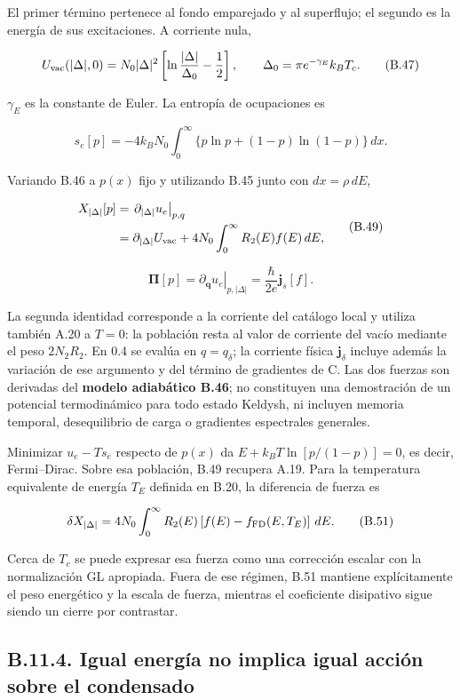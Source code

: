 \documentclass[
  spanish,
  10pt,
  a4paper,
]{article}
\begin{document}
El primer término pertenece al fondo emparejado y al superflujo; el
segundo es la energía de sus excitaciones. A corriente nula,

\[
U_{\rm vac}(|\Delta|,0)
=N_0|\Delta|^2\left[\ln\frac{|\Delta|}{\Delta_0}-\frac12\right],
\qquad \Delta_0=\pi e^{-\gamma_E}k_BT_c.
\tag{B.47}
\]

\(\gamma_E\) es la constante de Euler. La entropía de ocupaciones es

\[
s_e[p]=-4k_BN_0\int_0^\infty
\{p\ln p+(1-p)\ln(1-p)\}\,dx.
\tag{B.48}
\]

Variando B.46 a \(p(x)\) fijo y utilizando B.45 junto con
\(dx=\rho\,dE\),

\[
\begin{aligned}
X_{|\Delta|}[p]
&=\left.\partial_{|\Delta|}u_e\right|_{p,q}\\
&=\partial_{|\Delta|}U_{\rm vac}
+4N_0\int_0^\infty R_2(E)f(E)\,dE,
\end{aligned}
\tag{B.49}
\]

\[
\boldsymbol\Pi[p]
=\left.\partial_{\mathbf q}u_e\right|_{p,|\Delta|}
=\frac{\hbar}{2e}\mathbf j_s[f].
\tag{B.50}
\]

La segunda identidad corresponde a la corriente del catálogo local y
utiliza también A.20 a \(T=0\): la población resta al valor de corriente
del vacío mediante el peso \(2N_2R_2\). En 0.4 se evalúa en
\(q=q_\delta\); la corriente física \(\mathbf j_\delta\) incluye además
la variación de ese argumento y del término de gradientes de C. Las dos
fuerzas son derivadas del \textbf{modelo adiabático B.46}; no
constituyen una demostración de un potencial termodinámico para todo
estado Keldysh, ni incluyen memoria temporal, desequilibrio de carga o
gradientes espectrales generales.

Minimizar \(u_e-Ts_e\) respecto de \(p(x)\) da \(E+k_BT\ln[p/(1-p)]=0\),
es decir, Fermi--Dirac. Sobre esa población, B.49 recupera A.19. Para la
temperatura equivalente de energía \(T_E\) definida en B.20, la
diferencia de fuerza es

\[
\delta X_{|\Delta|}
=4N_0\int_0^\infty R_2(E)
\left[f(E)-f_{\rm FD}(E,T_E)\right]\,dE.
\tag{B.51}
\]

Cerca de \(T_c\) se puede expresar esa fuerza como una corrección
escalar con la normalización GL apropiada. Fuera de ese régimen, B.51
mantiene explícitamente el peso energético y la escala de fuerza,
mientras el coeficiente disipativo sigue siendo un cierre por
contrastar.

\subsection{B.11.4. Igual energía no implica igual acción sobre el
condensado}\label{b.11.4.-igual-energuxeda-no-implica-igual-acciuxf3n-sobre-el-condensado}
\end{document}

